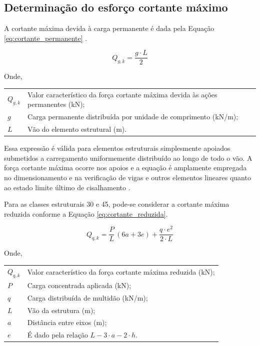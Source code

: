 \subsection{Determinação do esforço cortante máximo}\label{subsub:verificacao_cisalhamento}

A cortante máxima devida à carga permanente é dada pela Equação \eqref{eq:cortante_permanente} \parencite{CALIL2006}.

\begin{equation}
Q_{g,k} = \frac{g \cdot L}{2}
\label{eq:cortante_permanente}
\end{equation}

Onde, 

\begin{tabular}{ll}
$Q_{g,k}$ & Valor característico da força cortante máxima devida às ações permanentes (kN);\\
$g$ & Carga permanente distribuída por unidade de comprimento (kN/m);\\
$L$ & Vão do elemento estrutural (m).
\end{tabular}

Essa expressão é válida para elementos estruturais simplesmente apoiados submetidos a carregamento uniformemente distribuído ao longo de todo o vão. A força cortante máxima ocorre nos apoios e a equação é amplamente empregada no dimensionamento e na verificação de vigas e outros elementos lineares quanto ao estado limite último de cisalhamento \cite{CALIL2006}.

Para as classes estruturais 30 e 45, pode-se considerar a cortante máxima reduzida conforme a Equação \eqref{eq:cortante_reduzida}.

\begin{equation}
Q_{q,k} = \frac{P}{L}\,(6a + 3e) + \frac{q \cdot e^{2}}{2 \cdot L}
\label{eq:cortante_reduzida}
\end{equation}

Onde,

\begin{tabular}{ll}
$Q_{q,k}$ & Valor característico da força cortante máxima reduzida (kN);\\
$P$ & Carga concentrada aplicada (kN);\\
$q$ & Carga distribuída de multidão (kN/m);\\
$L$ & Vão da estrutura (m);\\
$a$ & Distância entre eixos (m);\\
$e$ & É dado pela relação $L - 3 \cdot a - 2 \cdot h$.
\end{tabular}

